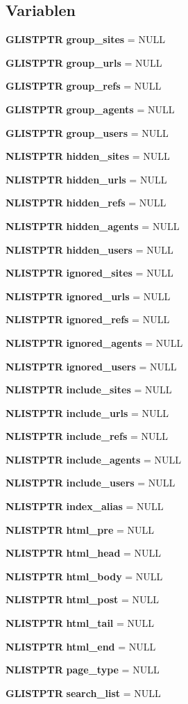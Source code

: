 \subsection*{Variablen}
\begin{CompactItemize}
\item 
{\bf GLISTPTR} {\bf group\_\-sites} = NULL
\item 
{\bf GLISTPTR} {\bf group\_\-urls} = NULL
\item 
{\bf GLISTPTR} {\bf group\_\-refs} = NULL
\item 
{\bf GLISTPTR} {\bf group\_\-agents} = NULL
\item 
{\bf GLISTPTR} {\bf group\_\-users} = NULL
\item 
{\bf NLISTPTR} {\bf hidden\_\-sites} = NULL
\item 
{\bf NLISTPTR} {\bf hidden\_\-urls} = NULL
\item 
{\bf NLISTPTR} {\bf hidden\_\-refs} = NULL
\item 
{\bf NLISTPTR} {\bf hidden\_\-agents} = NULL
\item 
{\bf NLISTPTR} {\bf hidden\_\-users} = NULL
\item 
{\bf NLISTPTR} {\bf ignored\_\-sites} = NULL
\item 
{\bf NLISTPTR} {\bf ignored\_\-urls} = NULL
\item 
{\bf NLISTPTR} {\bf ignored\_\-refs} = NULL
\item 
{\bf NLISTPTR} {\bf ignored\_\-agents} = NULL
\item 
{\bf NLISTPTR} {\bf ignored\_\-users} = NULL
\item 
{\bf NLISTPTR} {\bf include\_\-sites} = NULL
\item 
{\bf NLISTPTR} {\bf include\_\-urls} = NULL
\item 
{\bf NLISTPTR} {\bf include\_\-refs} = NULL
\item 
{\bf NLISTPTR} {\bf include\_\-agents} = NULL
\item 
{\bf NLISTPTR} {\bf include\_\-users} = NULL
\item 
{\bf NLISTPTR} {\bf index\_\-alias} = NULL
\item 
{\bf NLISTPTR} {\bf html\_\-pre} = NULL
\item 
{\bf NLISTPTR} {\bf html\_\-head} = NULL
\item 
{\bf NLISTPTR} {\bf html\_\-body} = NULL
\item 
{\bf NLISTPTR} {\bf html\_\-post} = NULL
\item 
{\bf NLISTPTR} {\bf html\_\-tail} = NULL
\item 
{\bf NLISTPTR} {\bf html\_\-end} = NULL
\item 
{\bf NLISTPTR} {\bf page\_\-type} = NULL
\item 
{\bf GLISTPTR} {\bf search\_\-list} = NULL
\end{CompactItemize}


